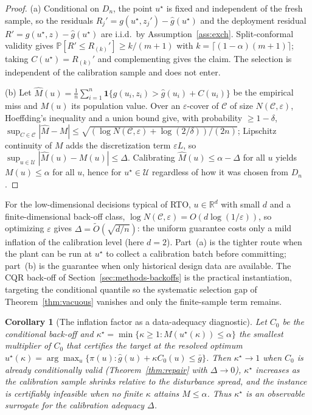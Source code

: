 \documentclass[journal]{IEEEtran}
\newtheorem{corollary}{Corollary}
\begin{document}
\begin{proof}
(a) Conditional on $D_n$, the point $u^\star$ is fixed and independent of the fresh sample, so the
residuals $R_j'=g(u^\star,z_j')-\hat g(u^\star)$ and the deployment residual
$R'=g(u^\star,z)-\hat g(u^\star)$ are i.i.d.\ by Assumption~\ref{ass:exch}. Split-conformal
validity \cite{vovk2005,lei2018} gives $\mathbb P[R'\le R_{(k)}']\ge k/(m+1)$ with
$k=\lceil(1-\alpha)(m+1)\rceil$; taking $C(u^\star)=R_{(k)}'$ and complementing gives the claim.
The selection is independent of the calibration sample and does not enter.

(b) Let $\widehat M(u)=\frac1n\sum_{i=1}^n\mathbf 1\{g(u_i,z_i)>\hat g(u_i)+C(u_i)\}$ be the
empirical miss and $M(u)$ its population value. Over an $\varepsilon$-cover of $\mathcal C$ of size
$N(\mathcal C,\varepsilon)$, Hoeffding's inequality and a union bound give, with probability
$\ge1-\delta$, $\sup_{C\in\mathcal C}|\widehat M-M|\le\sqrt{(\log N(\mathcal C,\varepsilon)+
\log(2/\delta))/(2n)}$; Lipschitz continuity of $M$ adds the discretization term $\varepsilon L$,
so $\sup_{u\in\mathcal U}|\widehat M(u)-M(u)|\le\Delta$. Calibrating $\widehat M(u)\le\alpha-\Delta$
for all $u$ yields $M(u)\le\alpha$ for all $u$, hence for $u^\star\in\mathcal U$ regardless of how
it was chosen from $D_n$.
\end{proof}

For the low-dimensional decisions typical of RTO, $u\in\mathbb R^d$ with small $d$ and a
finite-dimensional back-off class, $\log N(\mathcal C,\varepsilon)=O(d\log(1/\varepsilon))$, so
optimizing $\varepsilon$ gives $\Delta=\tilde O(\sqrt{d/n})$: the uniform guarantee costs only a
mild inflation of the calibration level (here $d=2$). Part~(a) is the tighter route when the plant
can be run at $u^\star$ to collect a calibration batch before committing; part~(b) is the
guarantee when only historical design data are available. The CQR back-off of
Section~\ref{sec:methods-backoffs} is the practical instantiation, targeting the conditional
quantile so the systematic selection gap of Theorem~\ref{thm:vacuous} vanishes and only the
finite-sample term remains.

\begin{corollary}[The inflation factor as a data-adequacy diagnostic]
\label{cor:kappa}
Let $C_0$ be the conditional back-off and
$\kappa^\star=\min\{\kappa\ge1:M(u^\star(\kappa))\le\alpha\}$ the smallest multiplier of $C_0$ that
certifies the target at the resolved optimum
$u^\star(\kappa)=\arg\max_u\{\pi(u):\hat g(u)+\kappa C_0(u)\le\bar g\}$. Then $\kappa^\star\to1$ when
$C_0$ is already conditionally valid (Theorem~\ref{thm:repair} with $\Delta\to0$), $\kappa^\star$
increases as the calibration sample shrinks relative to the disturbance spread, and the instance
is certifiably infeasible when no finite $\kappa$ attains $M\le\alpha$. Thus $\kappa^\star$ is an
observable surrogate for the calibration adequacy $\Delta$.
\end{corollary}
\end{document}
